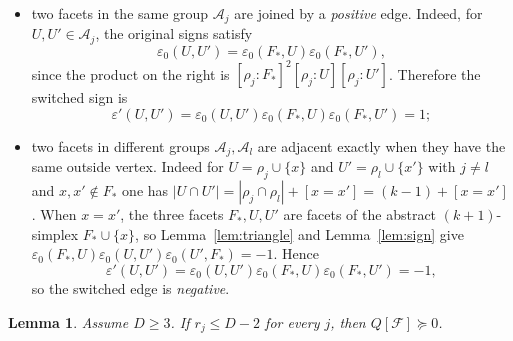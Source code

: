 \documentclass[11pt,reqno]{amsart}
\numberwithin{equation}{section}
\theoremstyle{plain}
\newtheorem{lemma}[theorem]{Lemma}
\theoremstyle{definition}
\newcommand{\eps}{\varepsilon}
\newcommand{\Aset}{\mathcal A}
\newcommand{\Fset}{\mathcal F}
\begin{document}
\begin{itemize}[leftmargin=1.6em,itemsep=0.25em]
\item two facets in the same group $\Aset_j$ are joined by a \emph{positive} edge. Indeed, for
$U,U'\in\Aset_j$, the original signs satisfy
\[
  \eps_0(U,U')=\eps_0(F_*,U)\eps_0(F_*,U'),
\]
since the product on the right is
${[\rho_j:F_*]}^{2}[\rho_j:U][\rho_j:U']$. Therefore the switched sign is
\[
  \eps'(U,U')
  =\eps_0(U,U')\eps_0(F_*,U)\eps_0(F_*,U')=1;
\]
\item two facets in different groups $\Aset_j,\Aset_l$ are adjacent exactly when they have the
same outside vertex. Indeed for $U=\rho_j\cup\{x\}$ and $U'=\rho_l\cup\{x'\}$ with $j\ne l$ and
$x,x'\notin F_*$ one has $|U\cap U'|=|\rho_j\cap\rho_l|+[x=x']=(k-1)+[x=x']$. When $x=x'$, the
three facets $F_*,U,U'$ are facets of the abstract $(k+1)$-simplex $F_*\cup\{x\}$, so
Lemma~\ref{lem:triangle} and Lemma~\ref{lem:sign} give
$\eps_0(F_*,U)\eps_0(U,U')\eps_0(U',F_*)=-1$. Hence
\[
  \eps'(U,U')
  =\eps_0(U,U')\eps_0(F_*,U)\eps_0(F_*,U')=-1,
\]
so the switched edge is \emph{negative}.
\end{itemize}

\begin{lemma}\label{lem:quadform}
Assume $D\ge3$. If $r_j\le D-2$ for every $j$, then $Q[\Fset]\succeq0$.
\end{lemma}
\end{document}

